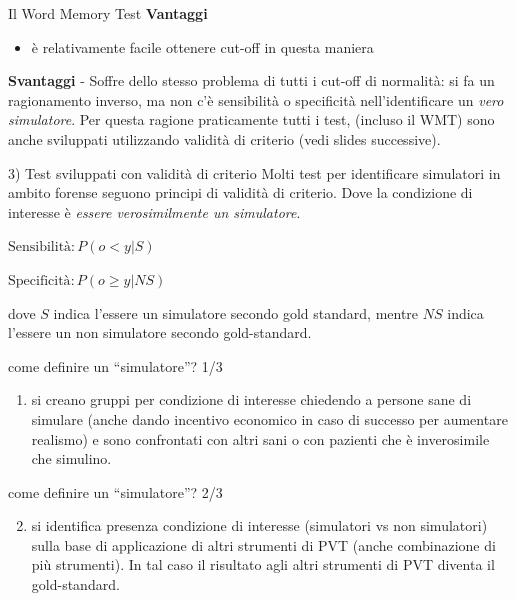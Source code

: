 \documentclass[
  ignorenonframetext,
  aspectratio=169,
]{beamer}
\providecommand{\tightlist}{%
  \setlength{\itemsep}{0pt}\setlength{\parskip}{0pt}}
\begin{document}
\begin{frame}{Il Word Memory Test}
\label{il-word-memory-test-1}
\textbf{Vantaggi}

\begin{itemize}
\tightlist
\item
  è relativamente facile ottenere cut-off in questa maniera
\end{itemize}

\textbf{Svantaggi} - Soffre dello stesso problema di tutti i cut-off di
normalità: si fa un ragionamento inverso, ma non c'è sensibilità o
specificità nell'identificare un \emph{vero simulatore}. Per questa
ragione praticamente tutti i test, (incluso il WMT) sono anche
sviluppati utilizzando validità di criterio (vedi slides successive).
\end{frame}

\begin{frame}{3) Test sviluppati con validità di criterio}
\label{test-sviluppati-con-validituxe0-di-criterio}
Molti test per identificare simulatori in ambito forense seguono
principi di validità di criterio. Dove la condizione di interesse è
\emph{essere verosimilmente un simulatore}.

\(\text{Sensibilità}: P(o < y | S)\)

\(\text{Specificità}: P(o \geq  y | NS)\)

dove \(S\) indica l'essere un simulatore secondo gold standard, mentre
\(NS\) indica l'essere un non simulatore secondo gold-standard.
\end{frame}

\begin{frame}{come definire un ``simulatore''? 1/3}
\label{come-definire-un-simulatore-13}
\small

\begin{enumerate}
\tightlist
\item
  si creano gruppi per condizione di interesse chiedendo a persone sane
  di simulare (anche dando incentivo economico in caso di successo per
  aumentare realismo) e sono confrontati con altri sani o con pazienti
  che è inverosimile che simulino.
\end{enumerate}
\end{frame}

\begin{frame}{come definire un ``simulatore''? 2/3}
\label{come-definire-un-simulatore-23}
\begin{enumerate}
\setcounter{enumi}{1}
\tightlist
\item
  si identifica presenza condizione di interesse (simulatori vs non
  simulatori) sulla base di applicazione di altri strumenti di PVT
  (anche combinazione di più strumenti). In tal caso il risultato agli
  altri strumenti di PVT diventa il gold-standard.
\end{enumerate}
\end{frame}
\end{document}
